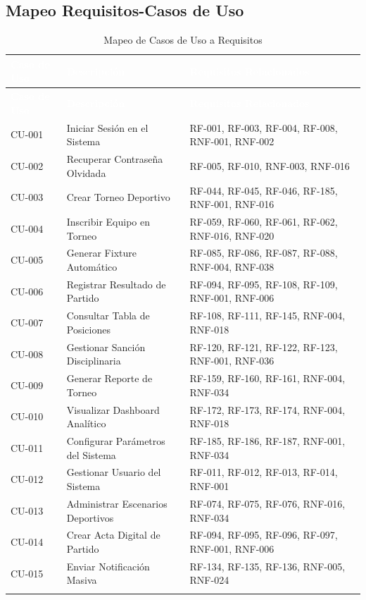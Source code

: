 \documentclass[12pt,a4paper]{article}
\begin{document}
\subsection{Mapeo Requisitos-Casos de Uso}

\begin{longtable}{|>{\centering\arraybackslash}p{2cm}|>{\raggedright\arraybackslash}p{5cm}|>{\raggedright\arraybackslash}p{7.5cm}|}
\hline
\rowcolor{headercolor}
\textcolor{white}{\textbf{Caso de Uso}} & \textcolor{white}{\textbf{Descripción}} & \textcolor{white}{\textbf{Requisitos Relacionados}} \\
\hline
\endfirsthead
\hline
\rowcolor{headercolor}
\textcolor{white}{\textbf{Caso de Uso}} & \textcolor{white}{\textbf{Descripción}} & \textcolor{white}{\textbf{Requisitos Relacionados}} \\
\hline
\endhead
\hline
\endlastfoot

CU-001 & Iniciar Sesión en el Sistema & RF-001, RF-003, RF-004, RF-008, RNF-001, RNF-002 \\
\hline
\rowcolor{rowgray}
CU-002 & Recuperar Contraseña Olvidada & RF-005, RF-010, RNF-003, RNF-016 \\
\hline
CU-003 & Crear Torneo Deportivo & RF-044, RF-045, RF-046, RF-185, RNF-001, RNF-016 \\
\hline
\rowcolor{rowgray}
CU-004 & Inscribir Equipo en Torneo & RF-059, RF-060, RF-061, RF-062, RNF-016, RNF-020 \\
\hline
CU-005 & Generar Fixture Automático & RF-085, RF-086, RF-087, RF-088, RNF-004, RNF-038 \\
\hline
\rowcolor{rowgray}
CU-006 & Registrar Resultado de Partido & RF-094, RF-095, RF-108, RF-109, RNF-001, RNF-006 \\
\hline
CU-007 & Consultar Tabla de Posiciones & RF-108, RF-111, RF-145, RNF-004, RNF-018 \\
\hline
\rowcolor{rowgray}
CU-008 & Gestionar Sanción Disciplinaria & RF-120, RF-121, RF-122, RF-123, RNF-001, RNF-036 \\
\hline
CU-009 & Generar Reporte de Torneo & RF-159, RF-160, RF-161, RNF-004, RNF-034 \\
\hline
\rowcolor{rowgray}
CU-010 & Visualizar Dashboard Analítico & RF-172, RF-173, RF-174, RNF-004, RNF-018 \\
\hline
CU-011 & Configurar Parámetros del Sistema & RF-185, RF-186, RF-187, RNF-001, RNF-034 \\
\hline
\rowcolor{rowgray}
CU-012 & Gestionar Usuario del Sistema & RF-011, RF-012, RF-013, RF-014, RNF-001 \\
\hline
CU-013 & Administrar Escenarios Deportivos & RF-074, RF-075, RF-076, RNF-016, RNF-034 \\
\hline
\rowcolor{rowgray}
CU-014 & Crear Acta Digital de Partido & RF-094, RF-095, RF-096, RF-097, RNF-001, RNF-006 \\
\hline
CU-015 & Enviar Notificación Masiva & RF-134, RF-135, RF-136, RNF-005, RNF-024 \\
\hline
\caption{Mapeo de Casos de Uso a Requisitos}
\end{longtable}
\newpage
\end{document}
